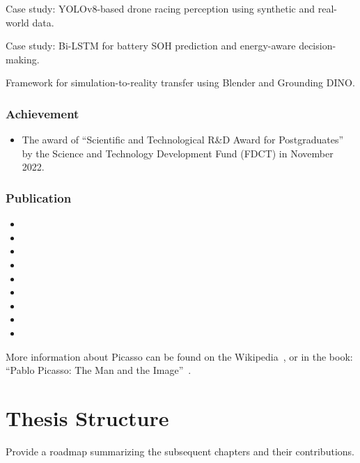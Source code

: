 Case study: YOLOv8-based drone racing perception using synthetic and real-world data.

Case study: Bi-LSTM for battery SOH prediction and energy-aware decision-making.

Framework for simulation-to-reality transfer using Blender and Grounding DINO.


\subsubsection{Achievement}

\begin{itemize}
	\item The award of ``Scientific and Technological R\&D Award for Postgraduates'' by the Science and Technology Development Fund (\gls{FDCT}) in November 2022.
\end{itemize}

\subsubsection{Publication}

\begin{itemize}\sloppy\emergencystretch=1em
	\item {}
	\item {}
	\item {}
	\item {}
	\item {}
	\item {}
	\item {}
	\item {}
	\item {}
\end{itemize}

More information about Picasso can be found on the Wikipedia~\cite{app_mono_camera}, or in the book: ``Pablo Picasso: The Man and the Image''~\cite{app_taxi}.



\section{Thesis Structure}

Provide a roadmap summarizing the subsequent chapters and their contributions.

\endinput